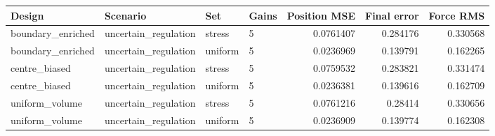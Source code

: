 \begin{tabular}{llllrrr}
\hline
Design & Scenario & Set & Gains & Position MSE & Final error & Force RMS \\
\hline
boundary\_enriched & uncertain\_regulation & stress & 5 & 0.0761407 & 0.284176 & 0.330568 \\
boundary\_enriched & uncertain\_regulation & uniform & 5 & 0.0236969 & 0.139791 & 0.162265 \\
centre\_biased & uncertain\_regulation & stress & 5 & 0.0759532 & 0.283821 & 0.331474 \\
centre\_biased & uncertain\_regulation & uniform & 5 & 0.0236381 & 0.139616 & 0.162709 \\
uniform\_volume & uncertain\_regulation & stress & 5 & 0.0761216 & 0.28414 & 0.330656 \\
uniform\_volume & uncertain\_regulation & uniform & 5 & 0.0236909 & 0.139774 & 0.162308 \\
\hline
\end{tabular}
